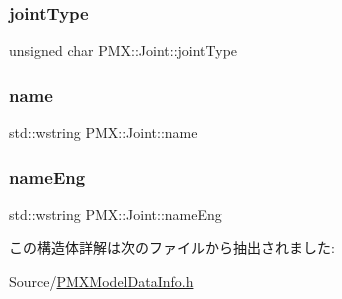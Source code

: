 \subsubsection{\texorpdfstring{joint\+Type}{jointType}}
{\footnotesize\ttfamily unsigned char P\+M\+X\+::\+Joint\+::joint\+Type}

\mbox{\label{struct_p_m_x_1_1_joint_a3b3ceda09449db6455870510d678b279}} 
\subsubsection{\texorpdfstring{name}{name}}
{\footnotesize\ttfamily std\+::wstring P\+M\+X\+::\+Joint\+::name}

\mbox{\label{struct_p_m_x_1_1_joint_ad9b219d5e9987000c69721aa1a753930}} 
\subsubsection{\texorpdfstring{name\+Eng}{nameEng}}
{\footnotesize\ttfamily std\+::wstring P\+M\+X\+::\+Joint\+::name\+Eng}



この構造体詳解は次のファイルから抽出されました\+:\begin{DoxyCompactItemize}
\item 
Source/\mbox{\hyperlink{_p_m_x_model_data_info_8h}{P\+M\+X\+Model\+Data\+Info.\+h}}\end{DoxyCompactItemize}

